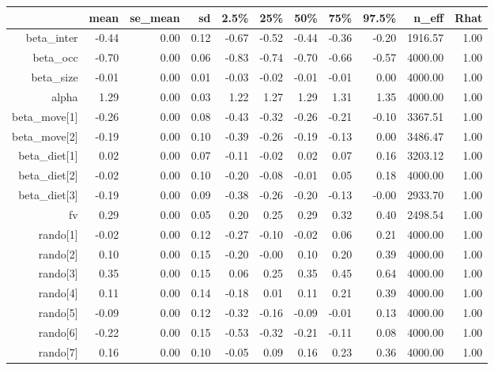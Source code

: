 \begin{table}[ht]
\centering
\begin{tabular}{rrrrrrrrrrr}
  \hline
 & mean & se\_mean & sd & 2.5\% & 25\% & 50\% & 75\% & 97.5\% & n\_eff & Rhat \\ 
  \hline
beta\_inter & -0.44 & 0.00 & 0.12 & -0.67 & -0.52 & -0.44 & -0.36 & -0.20 & 1916.57 & 1.00 \\ 
  beta\_occ & -0.70 & 0.00 & 0.06 & -0.83 & -0.74 & -0.70 & -0.66 & -0.57 & 4000.00 & 1.00 \\ 
  beta\_size & -0.01 & 0.00 & 0.01 & -0.03 & -0.02 & -0.01 & -0.01 & 0.00 & 4000.00 & 1.00 \\ 
  alpha & 1.29 & 0.00 & 0.03 & 1.22 & 1.27 & 1.29 & 1.31 & 1.35 & 4000.00 & 1.00 \\ 
  beta\_move[1] & -0.26 & 0.00 & 0.08 & -0.43 & -0.32 & -0.26 & -0.21 & -0.10 & 3367.51 & 1.00 \\ 
  beta\_move[2] & -0.19 & 0.00 & 0.10 & -0.39 & -0.26 & -0.19 & -0.13 & 0.00 & 3486.47 & 1.00 \\ 
  beta\_diet[1] & 0.02 & 0.00 & 0.07 & -0.11 & -0.02 & 0.02 & 0.07 & 0.16 & 3203.12 & 1.00 \\ 
  beta\_diet[2] & -0.02 & 0.00 & 0.10 & -0.20 & -0.08 & -0.01 & 0.05 & 0.18 & 4000.00 & 1.00 \\ 
  beta\_diet[3] & -0.19 & 0.00 & 0.09 & -0.38 & -0.26 & -0.20 & -0.13 & -0.00 & 2933.70 & 1.00 \\ 
  fv & 0.29 & 0.00 & 0.05 & 0.20 & 0.25 & 0.29 & 0.32 & 0.40 & 2498.54 & 1.00 \\ 
  rando[1] & -0.02 & 0.00 & 0.12 & -0.27 & -0.10 & -0.02 & 0.06 & 0.21 & 4000.00 & 1.00 \\ 
  rando[2] & 0.10 & 0.00 & 0.15 & -0.20 & -0.00 & 0.10 & 0.20 & 0.39 & 4000.00 & 1.00 \\ 
  rando[3] & 0.35 & 0.00 & 0.15 & 0.06 & 0.25 & 0.35 & 0.45 & 0.64 & 4000.00 & 1.00 \\ 
  rando[4] & 0.11 & 0.00 & 0.14 & -0.18 & 0.01 & 0.11 & 0.21 & 0.39 & 4000.00 & 1.00 \\ 
  rando[5] & -0.09 & 0.00 & 0.12 & -0.32 & -0.16 & -0.09 & -0.01 & 0.13 & 4000.00 & 1.00 \\ 
  rando[6] & -0.22 & 0.00 & 0.15 & -0.53 & -0.32 & -0.21 & -0.11 & 0.08 & 4000.00 & 1.00 \\ 
  rando[7] & 0.16 & 0.00 & 0.10 & -0.05 & 0.09 & 0.16 & 0.23 & 0.36 & 4000.00 & 1.00 \\ 

\end{tabular}
\end{table}
